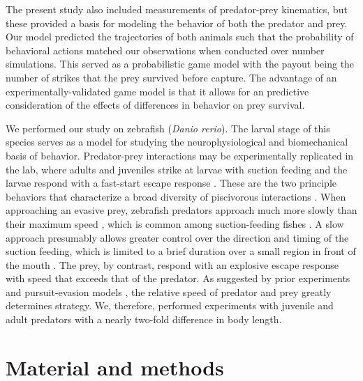 \documentclass[]{rsos}%
\begin{document}
The present study also included measurements of predator-prey kinematics, but these provided a basis for modeling the behavior of both the predator and prey.
Our model predicted the trajectories of both animals such that the probability of behavioral actions matched our observations when conducted over number simulations.
This served as a probabilistic game model with the payout being the number of strikes that the prey survived before capture.
The advantage of an experimentally-validated game model is that it allows for an predictive consideration of the effects of differences in behavior on prey survival.

We performed our study on zebrafish (\textit{Danio rerio}). 
The larval stage of this species serves as a model for studying the neurophysiological \cite{Bianco:2015gm,Bagnall:2014iu,Huang:2013vj} and biomechanical \cite{Muller:2004hp,Li:2016cy} basis of behavior.
Predator-prey interactions may be experimentally replicated in the lab, where adults and juveniles strike at larvae with suction feeding and the larvae respond with a fast-start escape response \cite{Stewart:2013bha}.
These are the two principle behaviors that characterize a broad diversity of piscivorous interactions \cite{Weihs:1984tb,Walker:2005vn}. 
When approaching an evasive prey, zebrafish predators approach much more slowly than their maximum speed \cite{Stewart:2013bha}, which is common among suction-feeding fishes \cite{Webb:1984jz,Higham:2007go}.
A slow approach presumably allows greater control over the direction and timing of the suction feeding, which is limited to a brief duration over a small region in front of the mouth \cite{Holzman:2008jc,Holzman:2009uu}. 
The prey, by contrast, respond with an explosive escape response with speed that exceeds that of the predator. 
As suggested by prior experiments \cite{Fuiman:1994td} and pursuit-evasion models \cite{Weihs:1984tb}, the relative speed of predator and prey greatly determines strategy.
We, therefore, performed experiments with juvenile and adult predators with a nearly two-fold difference in body length.


\section{Material and methods}
\end{document}
